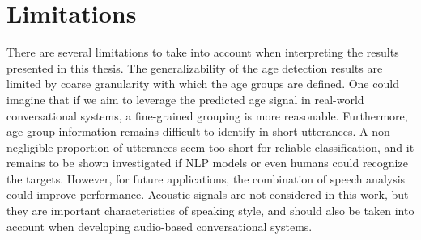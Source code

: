 
\section{Limitations}


There are several limitations to take into account when interpreting the results presented in this thesis. The generalizability of the age detection results are limited by coarse granularity with which the age groups are defined. One could imagine that if we aim to leverage the predicted age signal in real-world conversational systems, a fine-grained grouping is more reasonable. Furthermore, age group information remains difficult to identify in short utterances. A non-negligible proportion of utterances seem too short for reliable classification, and it remains to be shown investigated if NLP models or even humans could recognize the targets. However, for future applications, the combination of speech analysis could improve performance. Acoustic signals are not considered in this work, but they are important characteristics of speaking style, and should also be taken into account when developing audio-based conversational systems. 

